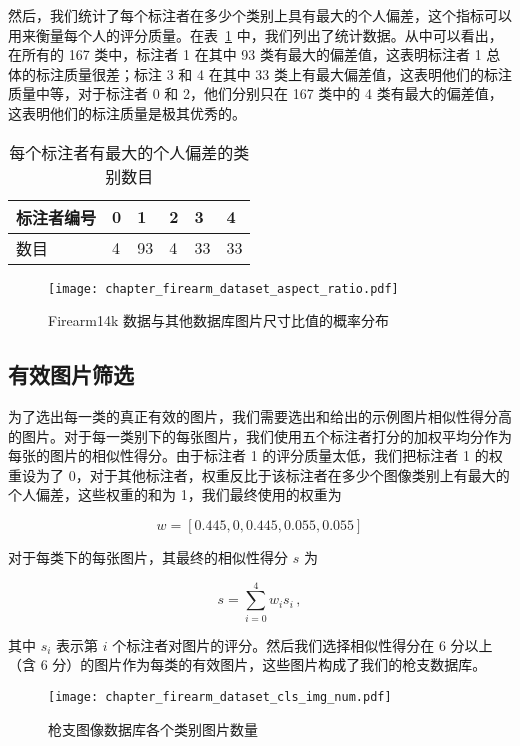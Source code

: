 然后，我们统计了每个标注者在多少个类别上具有最大的个人偏差，这个指标可以用来衡量每个人的评分质量。在表~\ref{table:largest_devi_num} 中，我们列出了统计数据。从中可以看出，在所有的 167 类中，标注者 1 在其中 93 类有最大的偏差值，这表明标注者 1 总体的标注质量很差；标注 3 和 4 在其中 33 类上有最大偏差值，这表明他们的标注质量中等，对于标注者 0 和 2，他们分别只在 167 类中的 4 类有最大的偏差值，这表明他们的标注质量是极其优秀的。

\begin{table}[!t]
	\centering
	\caption{每个标注者有最大的个人偏差的类别数目}
	\begin{tabular}{@{}llllll@{}}
		\toprule
		标注者编号	    &  0		& 1 & 2 & 3 & 4  \\
		\midrule
		数目 &  4 & 93 & 4 & 33 & 33 \\
		\bottomrule
	\end{tabular}
	\label{table:largest_devi_num}
\end{table}

\begin{figure}[!t]
	\centering
	\texttt{[image: chapter\_firearm\_dataset\_aspect\_ratio.pdf]}
	\caption{Firearm14k 数据与其他数据库图片尺寸比值的概率分布}
	\label{fig:dataset_aspect_ratio}
\end{figure}

\subsection{有效图片筛选}
为了选出每一类的真正有效的图片，我们需要选出和给出的示例图片相似性得分高的图片。对于每一类别下的每张图片，我们使用五个标注者打分的加权平均分作为每张的图片的相似性得分。由于标注者 1 的评分质量太低，我们把标注者 1 的权重设为了 0，对于其他标注者，权重反比于该标注者在多少个图像类别上有最大的个人偏差，这些权重的和为 1，我们最终使用的权重为

 \[w = [0.445, 0, 0.445, 0.055, 0.055]\]

对于每类下的每张图片，其最终的相似性得分 $s$ 为

\begin{equation}
s = \sum_{i=0}^{4}w_{i}s_{i}\, ,
\end{equation}

其中 $s_i$ 表示第 $i$ 个标注者对图片的评分。然后我们选择相似性得分在 6 分以上（含 6 分）的图片作为每类的有效图片，这些图片构成了我们的枪支数据库。

\begin{figure}[!t]
	\centering
	\texttt{[image: chapter\_firearm\_dataset\_cls\_img\_num.pdf]}
	\caption{枪支图像数据库各个类别图片数量}
	\label{fig:dataset_cls_img_num}
\end{figure}

